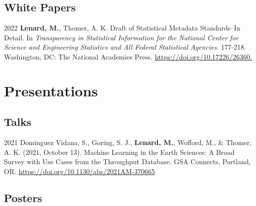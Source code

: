 \documentclass[12pt,letterpaper]{report}
\begin{document}
\subsection*{White Papers}

\begin{tablist}

	\item[2022] \tab \textbf{Lenard, M.}, Thomer, A. K. Draft of Statistical Metadata Standards--In Detail. In \textit{Transparency in Statistical Information for the National Center for Science and Engineering Statistics and All Federal Statistical Agencies.} 177-218. Washington, DC: The National Academies Press. \href{https://doi.org/10.17226/26360}{https://doi.org/10.17226/26360.}
	
\end{tablist}



\section*{Presentations}

\subsection*{Talks}

\begin{tablist}

	\item[2021] \tab Dominguez Vidana, S., Goring, S. J., \textbf{Lenard, M.}, Wofford, M., \& Thomer, A. K. (2021, October 13). Machine Learning in the Earth Sciences: A Broad Survey with Use Cases from the Throughput Database. GSA Connects, Portland, OR. \href{https://doi.org/10.1130/abs/2021AM-370665}{https://doi.org/10.1130/abs/2021AM-370665}
	    

\end{tablist}
    
\subsection*{Posters}
    
\end{document}
